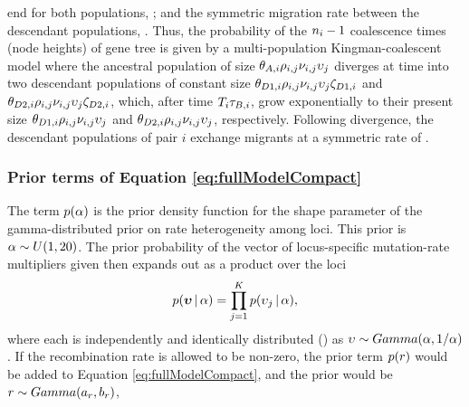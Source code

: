 \begin{linenomath}
end for both populations, \bottleTime{};
and the symmetric migration rate between the descendant populations,
\migrationRate{}.
Thus, the probability of the $\popSampleSize{i}{}-1$ coalescence times (node
heights) of gene tree  is given by a multi-population
Kingman-coalescent model \cite{Kingman1982} where the ancestral population of
size
$\ancestralTheta{i}\ploidyScalar{i}{j}\mutationRateScalarConstant{i}{j}\locusMutationRateScalar{j}$
diverges at time  into two descendant populations of constant
size
$\descendantTheta{1}{i}\ploidyScalar{i}{j}\mutationRateScalarConstant{i}{j}\locusMutationRateScalar{j}\bottleScalar{1}{i}$
and
$\descendantTheta{2}{i}\ploidyScalar{i}{j}\mutationRateScalarConstant{i}{j}\locusMutationRateScalar{j}\bottleScalar{2}{i}$,
which, after time $\divTimeMap{i}\bottleTime{i}$, grow exponentially to their
present size 
$\descendantTheta{1}{i}\ploidyScalar{i}{j}\mutationRateScalarConstant{i}{j}\locusMutationRateScalar{j}$
and
$\descendantTheta{2}{i}\ploidyScalar{i}{j}\mutationRateScalarConstant{i}{j}\locusMutationRateScalar{j}$,
respectively.
Following divergence, the descendant populations of pair $i$ exchange migrants at a symmetric rate of
.
\end{linenomath}


\subsubsection{Prior terms of Equation \ref{eq:fullModelCompact}}
\begin{linenomath}
The term $p(\alpha)$ is the prior density
function for the shape parameter of the gamma-distributed prior on
rate heterogeneity among loci.
This prior is $\alpha \sim U(1, 20)$.
The prior probability of the vector of locus-specific mutation-rate multipliers
given \locusRateHetShapeParameter then expands out as a product over
the loci
\begin{equation}
    p(\boldsymbol{\upsilon} \,|\, \alpha) =
    \prod_{j=1}^{K}
    p(\upsilon_{j} \,|\, \alpha),
    \label{eq:locusRateHetPrior}
\end{equation}
where each \locusMutationRateScalar{} is independently and identically
distributed (\iid) as
$\upsilon_{} \sim Gamma(\alpha,
1/\alpha)$.
If the recombination rate \recombinationRate is allowed to be non-zero, the
prior term $p(r)$ would be added to Equation
\ref{eq:fullModelCompact}, and the prior would be $r \sim
Gamma(a_{r}, b_{r})$,
\end{linenomath}

